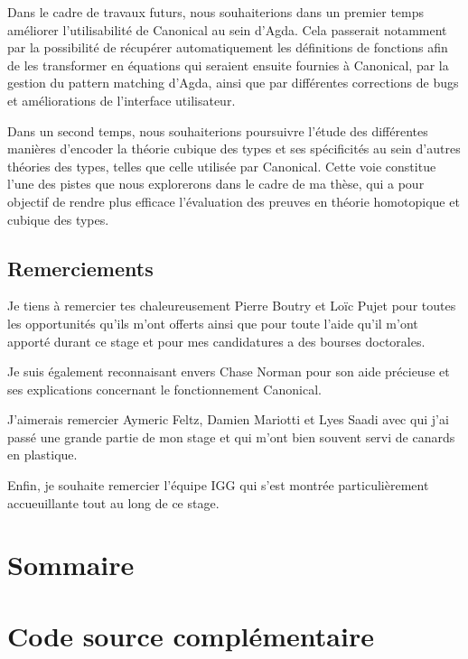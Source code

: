 \documentclass[11pt]{article}
\begin{document}
Dans le cadre de travaux futurs, nous souhaiterions dans un premier temps améliorer l’utilisabilité de Canonical au sein d’Agda. 
Cela passerait notamment par la possibilité de récupérer automatiquement les définitions de fonctions afin de les transformer en équations qui seraient ensuite fournies à Canonical, 
par la gestion du pattern matching d’Agda, ainsi que par différentes corrections de bugs et améliorations de l’interface utilisateur.

Dans un second temps, nous souhaiterions poursuivre l’étude des différentes manières d’encoder la théorie cubique des types et ses spécificités au sein d’autres théories des types, 
telles que celle utilisée par Canonical.
Cette voie constitue l’une des pistes que nous explorerons dans le cadre de ma thèse, 
qui a pour objectif de rendre plus efficace l’évaluation des preuves en théorie homotopique et cubique des types.

\subsection*{Remerciements}

Je tiens à remercier tes chaleureusement Pierre Boutry et Loïc Pujet pour toutes les opportunités 
qu'ils m'ont offerts ainsi que pour toute l'aide qu'il m'ont apporté durant ce stage et pour mes candidatures a des bourses doctorales.

Je suis également reconnaisant envers Chase Norman pour son aide précieuse et ses explications concernant le fonctionnement Canonical.

J'aimerais remercier Aymeric Feltz, Damien Mariotti et Lyes Saadi avec qui j'ai passé 
une grande partie de mon stage et qui m'ont bien souvent servi de canards en plastique.

Enfin, je souhaite remercier l'équipe IGG qui s'est montrée particulièrement accueuillante tout au long de ce stage.

\clearpage

\clearpage
\appendix

\section{Sommaire}
\tableofcontents
\clearpage
\section{Code source complémentaire}
\end{document}

